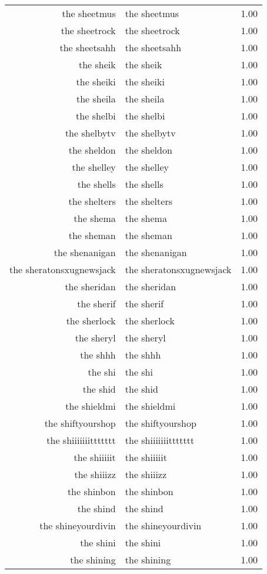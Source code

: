 \begin{table}[ht]
\begin{tabular}{rlr}
  the sheetmus & the sheetmus & 1.00 \\ 
  the sheetrock & the sheetrock & 1.00 \\ 
  the sheetsahh & the sheetsahh & 1.00 \\ 
  the sheik & the sheik & 1.00 \\ 
  the sheiki & the sheiki & 1.00 \\ 
  the sheila & the sheila & 1.00 \\ 
  the shelbi & the shelbi & 1.00 \\ 
  the shelbytv & the shelbytv & 1.00 \\ 
  the sheldon & the sheldon & 1.00 \\ 
  the shelley & the shelley & 1.00 \\ 
  the shells & the shells & 1.00 \\ 
  the shelters & the shelters & 1.00 \\ 
  the shema & the shema & 1.00 \\ 
  the sheman & the sheman & 1.00 \\ 
  the shenanigan & the shenanigan & 1.00 \\ 
  the sheratonsxugnewsjack & the sheratonsxugnewsjack & 1.00 \\ 
  the sheridan & the sheridan & 1.00 \\ 
  the sherif & the sherif & 1.00 \\ 
  the sherlock & the sherlock & 1.00 \\ 
  the sheryl & the sheryl & 1.00 \\ 
  the shhh & the shhh & 1.00 \\ 
  the shi & the shi & 1.00 \\ 
  the shid & the shid & 1.00 \\ 
  the shieldmi & the shieldmi & 1.00 \\ 
  the shiftyourshop & the shiftyourshop & 1.00 \\ 
  the shiiiiiiittttttt & the shiiiiiiittttttt & 1.00 \\ 
  the shiiiiit & the shiiiiit & 1.00 \\ 
  the shiiizz & the shiiizz & 1.00 \\ 
  the shinbon & the shinbon & 1.00 \\ 
  the shind & the shind & 1.00 \\ 
  the shineyourdivin & the shineyourdivin & 1.00 \\ 
  the shini & the shini & 1.00 \\ 
  the shining & the shining & 1.00 \\ 

\end{tabular}
\end{table}
